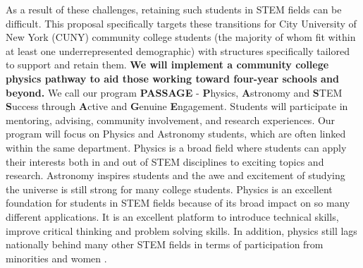 \documentclass[12pt]{article}
\begin{document}
As a result of these challenges, retaining such students in STEM fields can be difficult.
This proposal specifically targets these transitions for City University of New York (CUNY) community college students (the majority of whom fit within at least one underrepresented demographic) with structures specifically tailored to support and retain them.
{\bf We will implement a community college physics pathway to aid those working toward four-year schools and beyond.} We call our program {\bf PASSAGE} - {\bf P}hysics, {\bf A}stronomy and {\bf S}TEM {\bf S}uccess through {\bf A}ctive and {\bf G}enuine {\bf E}ngagement.  Students will participate in mentoring, advising, community involvement, and research experiences.  Our program will focus on Physics and Astronomy students, which are often linked within the same department.  %
Physics is a broad field where students can apply their interests both in and out of STEM disciplines to exciting topics and research. Astronomy inspires students and the awe and excitement of studying the universe is still strong for many college students.  Physics is an excellent foundation for students in STEM fields because of its broad impact on so many different applications. It is an excellent platform to introduce technical skills, improve critical thinking and problem solving skills.  In addition, physics still lags nationally behind many other STEM fields in terms of participation from minorities and women \citep{AIPwomen}.
\end{document}
